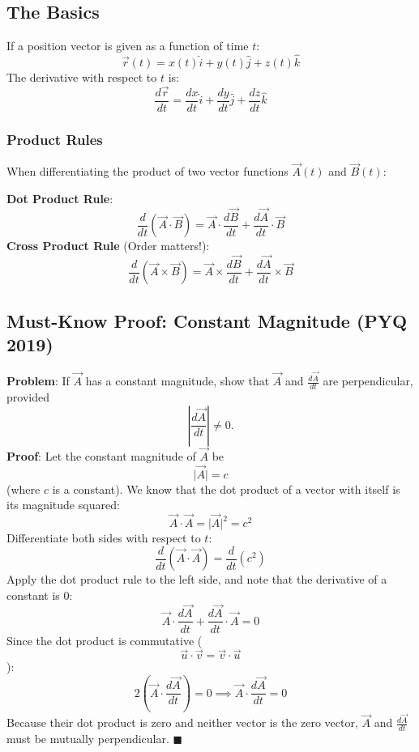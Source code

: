 \documentclass[
]{article}
\begin{document}
\subsection{The Basics}\label{the-basics}

If a position vector is given as a function of time \(t\):
\[
\vec{r}(t) = x(t)\hat{i} + y(t)\hat{j} + z(t)\hat{k}
\]
The derivative with respect to \(t\) is:
\[
\frac{d\vec{r}}{dt} = \frac{dx}{dt}\hat{i} + \frac{dy}{dt}\hat{j} + \frac{dz}{dt}\hat{k}
\]
\subsubsection{Product Rules}\label{product-rules}

When differentiating the product of two vector functions \(\vec{A}(t)\)
and \(\vec{B}(t)\):

\textbf{Dot Product Rule}:
\[
\frac{d}{dt} (\vec{A} \cdot \vec{B}) = \vec{A} \cdot \frac{d\vec{B}}{dt} + \frac{d\vec{A}}{dt} \cdot \vec{B}
\]
\textbf{Cross Product Rule} (Order matters!):
\[
\frac{d}{dt} (\vec{A} \times \vec{B}) = \vec{A} \times \frac{d\vec{B}}{dt} + \frac{d\vec{A}}{dt} \times \vec{B}
\]

\subsection{Must-Know Proof: Constant Magnitude (PYQ
2019)}\label{must-know-proof-constant-magnitude-pyq-2019}

\textbf{Problem}: If \(\vec{A}\) has a constant magnitude, show that
\(\vec{A}\) and \(\frac{d\vec{A}}{dt}\) are perpendicular, provided
\[
\left\lvert \frac{d\vec{A}}{dt}\right\rvert  \neq 0.
\]
\textbf{Proof}: Let the constant magnitude of \(\vec{A}\) be
\[
\lvert \vec{A} \rvert = c
\]
(where \(c\) is a constant). We know that the dot product of a vector
with itself is its magnitude squared:
\[
\vec{A} \cdot \vec{A} = \lvert \vec{A} \rvert^2 = c^2
\]
Differentiate both sides with respect to \(t\):
\[
\frac{d}{dt} (\vec{A} \cdot \vec{A}) = \frac{d}{dt} (c^2)
\]
Apply the dot product rule to the left side, and note that the
derivative of a constant is 0:
\[
\vec{A} \cdot \frac{d\vec{A}}{dt} + \frac{d\vec{A}}{dt} \cdot \vec{A} = 0
\]
Since the dot product is commutative (
\[
\vec{u} \cdot \vec{v} = \vec{v} \cdot \vec{u}
\]
):
\[
2 \left( \vec{A} \cdot \frac{d\vec{A}}{dt} \right) = 0 \implies \vec{A} \cdot \frac{d\vec{A}}{dt} = 0
\]
Because their dot product is zero and neither vector is the zero vector,
\(\vec{A}\) and \(\frac{d\vec{A}}{dt}\) must be mutually perpendicular.
\(\blacksquare\)
\end{document}
